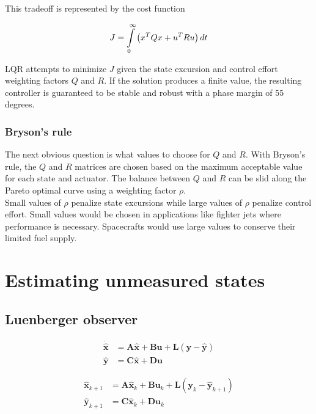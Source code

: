 \documentclass[10pt,conference,compsoc]{IEEEtran}
\newcommand{\mtx}[1] {\bm #1}
\begin{document}
This tradeoff is represented by the cost function

\begin{equation*}
  J = \int\limits_0^\infty \left(x^T Q x + u^T R u \right) dt \\
\end{equation*}

\noindent LQR attempts to minimize $J$ given the \gls{state} excursion and
control effort weighting factors $Q$ and $R$. If the solution produces a finite
value, the resulting controller is guaranteed to be stable and robust with a
phase margin of 55 degrees.

\subsubsection{Bryson's rule}

\noindent The next obvious question is what values to choose for $Q$ and $R$.
With Bryson's rule, the $Q$ and $R$ matrices are chosen based on the maximum
acceptable value for each \gls{state} and actuator. The balance between $Q$ and
$R$ can be slid along the Pareto optimal curve using a weighting factor $\rho$.
\\

\noindent Small values of $\rho$ penalize \gls{state} excursions while large
values of $\rho$ penalize control effort. Small values would be chosen in
applications like fighter jets where performance is necessary. Spacecrafts would
use large values to conserve their limited fuel supply.

\section{Estimating unmeasured states}

\subsection{Luenberger observer}

\begin{align}
  \dot{\hat{\mtx{x}}} &= \mtx{A}\hat{\mtx{x}} + \mtx{B}\mtx{u} +
    \mtx{L} (\mtx{y} - \hat{\mtx{y}}) \label{eq:s_obsv_x} \\
  \hat{\mtx{y}} &= \mtx{C}\hat{\mtx{x}} + \mtx{D}\mtx{u} \label{eq:s_obsv_y}
\end{align}

\begin{align}
  \hat{\mtx{x}}_{k+1} &= \mtx{A}\hat{\mtx{x}}_k + \mtx{B}\mtx{u}_k +
    \mtx{L} (\mtx{y}_k - \hat{\mtx{y}}_{k+1}) \label{eq:z_obsv_x} \\
  \hat{\mtx{y}}_{k+1} &= \mtx{C}\hat{\mtx{x}}_k +
    \mtx{D}\mtx{u}_k \label{eq:z_obsv_y} \\ \nonumber
\end{align}
\end{document}
